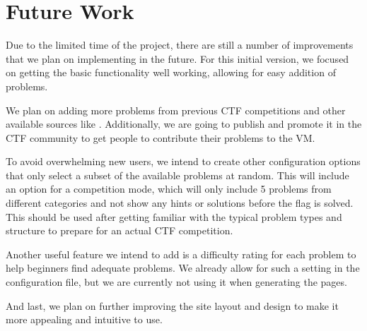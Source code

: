 \section{Future Work} Due to the limited time of the project, there are still a
number of improvements that we plan on implementing in the future. For this
initial version, we focused on getting the basic functionality well working,
allowing for easy addition of problems.

We plan on adding more problems from previous CTF competitions and other
available sources like \cite{ctf:github}. Additionally, we are going to publish
\cvm{} and promote it in the CTF community to get people to contribute their
problems to the VM.

To avoid overwhelming new users, we intend to create other configuration
options that only select a subset of the available problems at random. This
will include an option for a competition mode, which will only include 5
problems from different categories and not show any hints or solutions before
the flag is solved. This should be used after getting familiar with the typical
problem types and structure to prepare for an actual CTF competition.

Another useful feature we intend to add is a difficulty rating for each problem
to help beginners find adequate problems. We already allow for such a setting
in the configuration file, but we are currently not using it when generating
the pages.

And last, we plan on further improving the site layout and design to make it
more appealing and intuitive to use.
